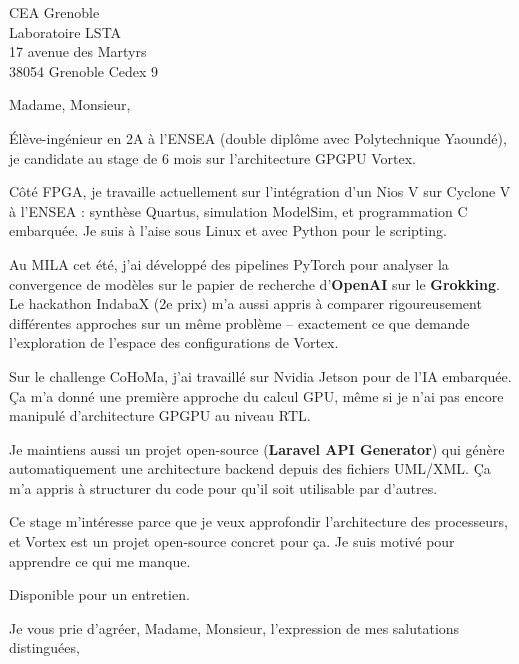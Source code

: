\documentclass[11pt,a4paper]{letter}
\begin{document}
\begin{letter}{CEA Grenoble\\
Laboratoire LSTA\\
17 avenue des Martyrs\\
38054 Grenoble Cedex 9}

\opening{Madame, Monsieur,}

Élève-ingénieur en 2A à l'ENSEA (double diplôme avec Polytechnique Yaoundé), je candidate au stage de 6 mois sur l'architecture GPGPU Vortex.

Côté FPGA, je travaille actuellement sur l'intégration d'un Nios V sur Cyclone V à l'ENSEA : synthèse Quartus, simulation ModelSim, et programmation C embarquée. Je suis à l'aise sous Linux et avec Python pour le scripting.

Au MILA cet été, j'ai développé des pipelines PyTorch pour analyser la convergence de modèles sur le papier de recherche d'\textbf{OpenAI} sur le \textbf{Grokking}. Le hackathon IndabaX (2e prix) m'a aussi appris à comparer rigoureusement différentes approches sur un même problème -- exactement ce que demande l'exploration de l'espace des configurations de Vortex.

Sur le challenge CoHoMa, j'ai travaillé sur Nvidia Jetson pour de l'IA embarquée. Ça m'a donné une première approche du calcul GPU, même si je n'ai pas encore manipulé d'architecture GPGPU au niveau RTL.

Je maintiens aussi un projet open-source (\textbf{Laravel API Generator}) qui génère automatiquement une architecture backend depuis des fichiers UML/XML. Ça m'a appris à structurer du code pour qu'il soit utilisable par d'autres.

Ce stage m'intéresse parce que je veux approfondir l'architecture des processeurs, et Vortex est un projet open-source concret pour ça. Je suis motivé pour apprendre ce qui me manque.

Disponible pour un entretien.

\closing{Je vous prie d'agréer, Madame, Monsieur, l'expression de mes salutations distinguées,}

\end{letter}
\end{document}
